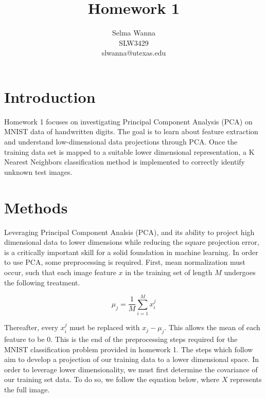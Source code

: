 \documentclass[12pt]{article}
\begin{document}
 
 
\title{Homework 1}
\author{Selma Wanna \\ SLW3429 \\ slwanna@utexas.edu} 
\maketitle
 
\section{Introduction}

Homework 1 focuses on investigating Principal Component Analysis (PCA) on MNIST data of handwritten digits. The goal is to learn about feature extraction and understand low-dimensional data projections through PCA. Once the training data set is mapped to a suitable lower dimensional representation, a K Nearest Neighbors classification method is implemented to correctly identify unknown test images.

\section{Methods}
Leveraging Principal Component Analsis (PCA), and its ability to project high dimensional data to lower dimensions while reducing the square projection error, is a critically important skill for a solid foundation in machine learning.
\bigbreak
\noindent
In order to use PCA, some preprocessing is required. First, mean normalization must occur, such that each image feature \(x\) in the training set of length \(M\) undergoes the following treatment.

\[\mu_{j} = \frac{1}{M}\sum_{i=1}^{M} {x}_{i}^{j} \]

\noindent
Thereafter, every \({x}_{i}^{j}\) must be replaced with \({x}_{j}-{\mu}_{j}\). This allows the mean of each feature to be 0. This is the end of the preprocessing steps required for the MNIST classification problem provided in homework 1. The steps which follow aim to  develop a projection of our training data to a lower dimensional space.
\bigbreak
\noindent
In order to leverage lower dimensionality, we must first determine the covariance of our training set data. To do so, we follow the equation below, where \(X\) represents the full image.
\end{document}
